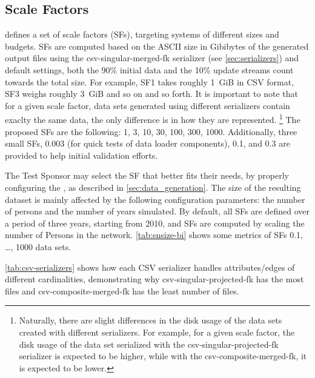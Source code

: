 \subsection{Scale Factors}
\label{sec:scale-factors}

\ldbcsnb defines a set of scale factors (SFs), targeting systems of different sizes and budgets.
SFs are computed based on the ASCII size in Gibibytes of the generated output files using the \textsf{csv-singular-merged-fk} serializer (see \autoref{sec:serializers}) and default settings, \ie both the 90\% initial data and the 10\% update streams count towards the total size.
For example, SF1 takes roughly 1~GiB in CSV format, SF3 weighs roughly 3~GiB and so on and so forth.
It is important to note that for a given scale factor, data sets generated using different serializers contain exaclty the same data, the only difference is in how they are represented.%
\footnote{Naturally, there are slight differences in the disk usage of the data sets created with different serializers. For example, for a given scale factor, the disk usage of the data set serialized with the \textsf{csv-singular-projected-fk} serializer is expected to be higher, while with the \textsf{csv-composite-merged-fk}, it is expected to be lower.}
The proposed SFs are the following: 1, 3, 10, 30, 100, 300, 1000.
Additionally, three small SFs, 0.003 (for quick tests of data loader components), 0.1, and 0.3 are provided to help initial validation efforts.

The Test Sponsor may select the SF that better fits their needs, by properly configuring the \datagen, as described in \autoref{sec:data_generation}.
The size of the resulting dataset is mainly affected by the following configuration parameters: the number of persons and the number of years simulated.
By default, all SFs are defined over a period of three years, starting from 2010, and SFs are computed by scaling the number of Persons in the network.
\autoref{tab:snsize-bi} shows some metrics of SFs 0.1, \ldots, 1000 data sets.






\autoref{tab:csv-serializers} shows how each CSV serializer handles attributes/edges of different cardinalities, demonstrating why \textsf{csv-singular-projected-fk} has the most files and \textsf{csv-composite-merged-fk} has the least number of files.

